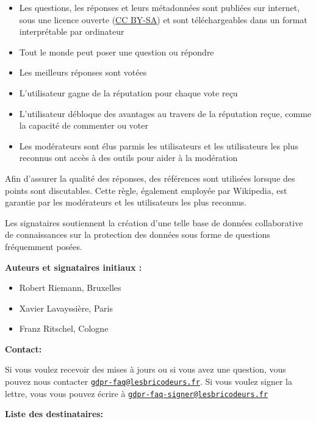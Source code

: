 \documentclass{scrlttr2}
\let\tightlist\relax
\begin{document}
\begin{letter}{}
\begin{itemize}
\tightlist
\item
  Les questions, les réponses et leurs métadonnées sont publiées sur
  internet, sous une licence ouverte
  (\href{https://creativecommons.org/licenses/by-sa/3.0/}{CC BY-SA}) et
  sont téléchargeables dans un format interprétable par ordinateur
\item
  Tout le monde peut poser une question ou répondre
\item
  Les meilleurs réponses sont votées
\item
  L'utilisateur gagne de la réputation pour chaque vote reçu
\item
  L'utilisateur débloque des avantages au travers de la réputation
  reçue, comme la capacité de commenter ou voter
\item
  Les modérateurs sont élus parmis les utilisateurs et les utilisateurs
  les plus reconnus ont accès à des outils pour aider à la modération
\end{itemize}

Afin d'assurer la qualité des réponses, des références sont utilisées
lorsque des points sont discutables. Cette règle, également employée par
Wikipedia, est garantie par les modérateurs et les utilisateurs les plus
reconnus.

Les signataires soutiennent la création d'une telle base de données
collaborative de connaissances sur la protection des données sous forme
de questions fréquemment posées.

\textbf{Auteurs et signataires initiaux :}

\begin{itemize}
\tightlist
\item
  Robert Riemann, Bruxelles
\item
  Xavier Lavayssière, Paris
\item
  Franz Ritschel, Cologne
\end{itemize}

\textbf{Contact:}

Si vous voulez recevoir des mises à jours ou si vous avez une question,
vous pouvez nous contacter
\href{mailto:gdpr-faq@lesbricodeurs.fr}{\nolinkurl{gdpr-faq@lesbricodeurs.fr}}.
Si vous voulez signer la lettre, vous vous pouvez écrire à
\href{mailto:gdpr-faq-signer@lesbricodeurs.fr}{\nolinkurl{gdpr-faq-signer@lesbricodeurs.fr}}

\newpage

\textbf{Liste des destinataires:}


\end{letter}
\end{document}

